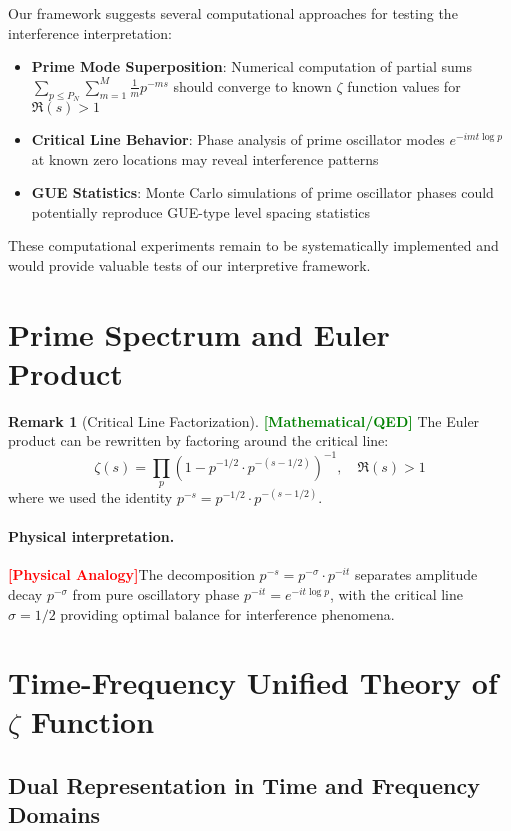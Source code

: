 \documentclass[12pt]{article}
\theoremstyle{plain}
\theoremstyle{definition}
\newtheorem{remark}[theorem]{Remark}
\newcommand{\statusmath}{\textcolor{green}{\textbf{[Mathematical/QED]}}}
\newcommand{\statusanalogy}{\textcolor{red}{\textbf{[Physical Analogy]}}}
\begin{document}
Our framework suggests several computational approaches for testing the interference interpretation:

\begin{itemize}
\item \textbf{Prime Mode Superposition}: Numerical computation of partial sums $\sum_{p \leq P_N}\sum_{m=1}^M \frac{1}{m}p^{-ms}$ should converge to known $\zeta$ function values for $\Re(s) > 1$
\item \textbf{Critical Line Behavior}: Phase analysis of prime oscillator modes $e^{-imt\log p}$ at known zero locations may reveal interference patterns
\item \textbf{GUE Statistics}: Monte Carlo simulations of prime oscillator phases could potentially reproduce GUE-type level spacing statistics
\end{itemize}

These computational experiments remain to be systematically implemented and would provide valuable tests of our interpretive framework.



\section{Prime Spectrum and Euler Product}

\begin{remark}[Critical Line Factorization] \statusmath
The Euler product can be rewritten by factoring around the critical line:
$$\zeta(s) = \prod_p \left(1 - p^{-1/2} \cdot p^{-(s-1/2)}\right)^{-1}, \quad \Re(s) > 1$$
where we used the identity $p^{-s} = p^{-1/2} \cdot p^{-(s-1/2)}$.
\end{remark}

\paragraph{Physical interpretation.} \statusanalogy The decomposition $p^{-s} = p^{-\sigma} \cdot p^{-it}$ separates amplitude decay $p^{-\sigma}$ from pure oscillatory phase $p^{-it} = e^{-it\log p}$, with the critical line $\sigma = 1/2$ providing optimal balance for interference phenomena.

\section{Time-Frequency Unified Theory of $\zeta$ Function}

\subsection{Dual Representation in Time and Frequency Domains}
\end{document}
